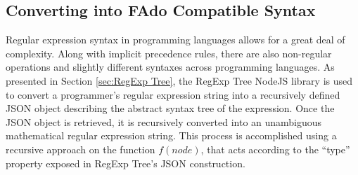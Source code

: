 \subsection{Converting into FAdo Compatible Syntax}
\label{subsec:Converting into FAdo Compatible Syntax}
Regular expression syntax in programming languages allows for a great deal of complexity. Along with implicit precedence rules, there are also non-regular operations and slightly different syntaxes across programming languages. As presented in Section \ref{sec:RegExp Tree}, the RegExp Tree NodeJS library is used to convert a programmer's regular expression string into a recursively defined JSON object describing the abstract syntax tree of the expression. Once the JSON object is retrieved, it is recursively converted into an unambiguous mathematical regular expression string. This process is accomplished using a recursive approach on the function $f(node)$, that acts according to the ``type'' property exposed in RegExp Tree's JSON construction.

